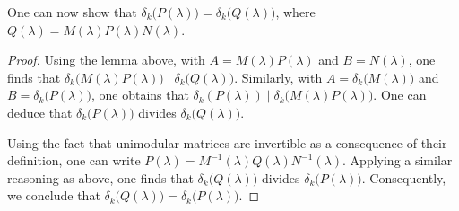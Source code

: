 \documentclass[11pt]{article}
\begin{document}
One can now show that \(\delta_k\big(P(\lambda)\big) = \delta_k\big(Q(\lambda)\big)\), where \(Q(\lambda) = M(\lambda) P(\lambda) N(\lambda)\).
\begin{proof}
Using the lemma above, with $A=M(\lambda)P(\lambda)$ and $B=N(\lambda)$, one finds that $\delta_k\big(M(\lambda)P(\lambda)\big) \mid \delta_k\big(Q(\lambda)\big)$. Similarly, with $A=\delta_k\big(M(\lambda)\big)$ and $B=\delta_k\big(P(\lambda)\big)$, one obtains that $\delta_k(P(\lambda)) \mid \delta_k\big(M(\lambda)P(\lambda)\big)$.
One can deduce that $\delta_k\big(P(\lambda)\big)$ divides $\delta_k\big(Q(\lambda)\big)$.

Using the fact that unimodular matrices are invertible as a consequence of their definition, one can write $P(\lambda)=M^{-1}(\lambda)Q(\lambda)N^{-1}(\lambda)$.
Applying a similar reasoning as above, one finds that $\delta_k\big(Q(\lambda)\big)$ divides $\delta_k\big(P(\lambda)\big)$.
Consequently, we conclude that $\delta_k\big(Q(\lambda)\big) = \delta_k\big(P(\lambda)\big)$.
\end{proof}
\end{document}

